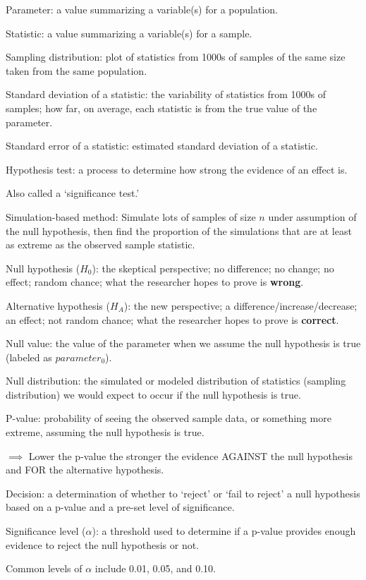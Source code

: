 \documentclass[
]{report}
\newcommand{\rgi}{\hspace{24pt}}  %
\begin{document}
Parameter: a value summarizing a variable(s) for a population.

Statistic: a value summarizing a variable(s) for a sample.

Sampling distribution: plot of statistics from 1000s of samples of the same size taken from the same population.

Standard deviation of a statistic: the variability of statistics from 1000s of samples; how far, on average, each statistic is from the true value of the parameter.

Standard error of a statistic: estimated standard deviation of a statistic.

Hypothesis test: a process to determine how strong the evidence of an effect is.

\rgi Also called a `significance test.'

Simulation-based method: Simulate lots of samples of size \(n\) under assumption of the null hypothesis, then find the proportion of the simulations that are at least as extreme as the observed sample statistic.

Null hypothesis (\(H_0\)): the skeptical perspective; no difference; no change; no effect; random chance; what the researcher hopes to prove is \textbf{wrong}.

Alternative hypothesis (\(H_A\)): the new perspective; a difference/increase/decrease; an effect; not random chance; what the researcher hopes to prove is \textbf{correct}.

Null value: the value of the parameter when we assume the null hypothesis is true (labeled as \(parameter_0\)).

Null distribution: the simulated or modeled distribution of statistics (sampling distribution) we would expect to occur if the null hypothesis is true.

P-value: probability of seeing the observed sample data, or something more extreme, assuming the null hypothesis is true.

\(\implies\) Lower the p-value the stronger the evidence AGAINST the null hypothesis and FOR the alternative hypothesis.

Decision: a determination of whether to `reject' or `fail to reject' a null hypothesis based on a p-value and a pre-set level of significance.

Significance level (\(\alpha\)): a threshold used to determine if a p-value provides enough evidence to reject the null hypothesis or not.

\rgi Common levels of \(\alpha\) include 0.01, 0.05, and 0.10.
\end{document}
